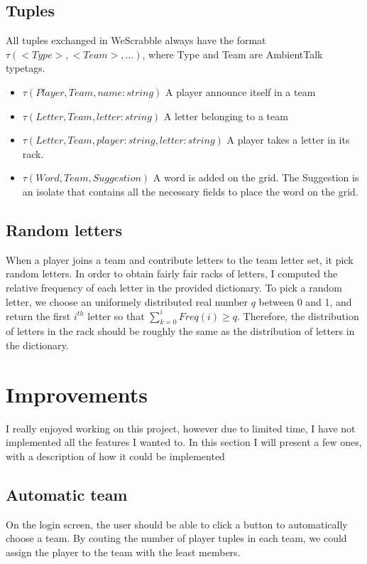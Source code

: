 \documentclass[a4paper,12pt]{article}
\begin{document}
\subsection{Tuples}
All tuples exchanged in WeScrabble always have the format $\tau(<Type>, <Team>, ...)$, where Type and Team are AmbientTalk typetags.
\begin{itemize}
  \item $\tau(Player, Team, name:string)$ A player announce itself in a team
  \item $\tau(Letter, Team, letter:string)$ A letter belonging to a team
  \item $\tau(Letter, Team, player:string, letter:string)$ A player takes a letter in its rack.
  \item $\tau(Word, Team, Suggestion)$ A word is added on the grid. The Suggestion is an isolate that contains all the necessary fields to place the word on the grid.
\end{itemize}

\subsection{Random letters}
When a player joins a team and contribute letters to the team letter set, it pick random letters. In order to obtain fairly fair racks of letters, I computed the relative frequency of each letter in the provided dictionary. To pick a random letter, we choose an uniformely distributed real number $q$ between 0 and 1, and return the first $i^{th}$ letter so that $\sum_{k=0}^{i} Freq(i) \geq q$. Therefore, the distribution of letters in the rack should be roughly the same as the distribution of letters in the dictionary.


\section{Improvements}
I really enjoyed working on this project, however due to limited time, I have not implemented all the features I wanted to. In this section I will present a few ones, with a description of how it could be implemented

\subsection{Automatic team}
On the login screen, the user should be able to click a button to automatically choose a team. By couting the number of player tuples in each team, we could assign the player to the team with the least members.
\end{document}
